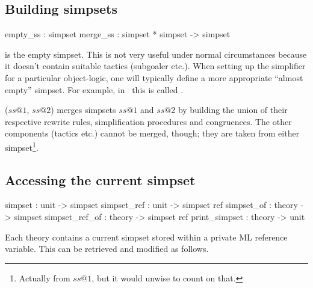 \subsection{Building simpsets}
\begin{ttbox}
empty_ss : simpset
merge_ss : simpset * simpset -> simpset
\end{ttbox}
\begin{ttdescription}
  
\item[\ttindexbold{empty_ss}] is the empty simpset.  This is not very
  useful under normal circumstances because it doesn't contain
  suitable tactics (subgoaler etc.).  When setting up the simplifier
  for a particular object-logic, one will typically define a more
  appropriate ``almost empty'' simpset.  For example, in \HOL\ this is
  called .
  
\item[\ttindexbold{merge_ss} ($ss@1$, $ss@2$)] merges simpsets $ss@1$
  and $ss@2$ by building the union of their respective rewrite rules,
  simplification procedures and congruences.  The other components
  (tactics etc.) cannot be merged, though; they are taken from either
  simpset\footnote{Actually from $ss@1$, but it would unwise to count
    on that.}.

\end{ttdescription}


\subsection{Accessing the current simpset}

\begin{ttbox}
simpset        : unit -> simpset
simpset_ref    : unit -> simpset ref
simpset_of     : theory -> simpset
simpset_ref_of : theory -> simpset ref
print_simpset  : theory -> unit
\end{ttbox}

Each theory contains a current simpset stored
within a private ML reference variable.  This can be retrieved and
modified as follows.

